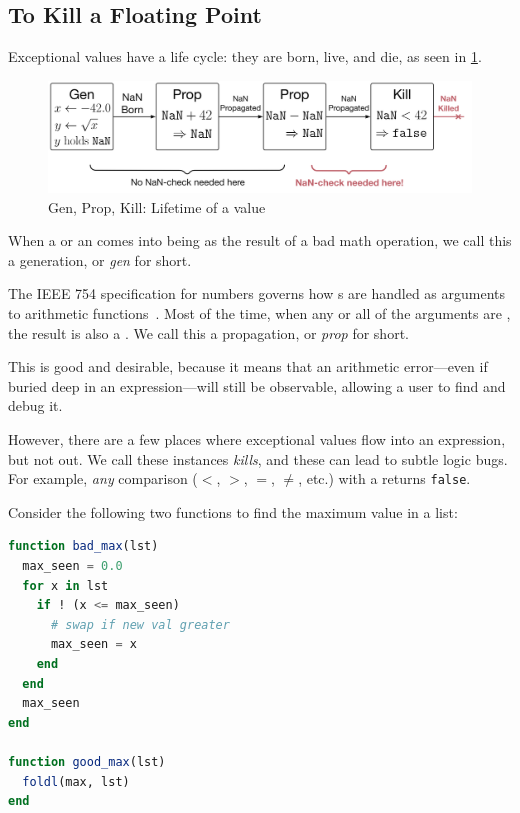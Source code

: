 \documentclass{juliacon}
\begin{document}
\subsection{To Kill a Floating Point}
\label{s:to-kill-a-fp}

Exceptional values have a life cycle: they are born, live, and die, as seen in \cref{f:gpk}.

\begin{figure}
  \includegraphics[width=\columnwidth]{fig/genpropkill-outline.png}
  \caption{Gen, Prop, Kill: Lifetime of a \NaN{} value}
  \label{f:gpk}
\end{figure}

When a \NaN{} or an \Inf{} comes into being as the result of a bad math operation, we call this a generation, or \emph{gen} for short.

The IEEE 754 specification for \fp{} numbers governs how \NaN{}s are handled as arguments to arithmetic functions~\cite{IEEEStandardBinary1985}.
Most of the time, when any or all of the arguments are \NaN{}, the result is also a \NaN{}.
We call this a propagation, or \emph{prop} for short.

This is good and desirable, because it means that an arithmetic error---even if buried deep in an expression---will still be observable, allowing a user to find and debug it.

However, there are a few places where exceptional values flow into an expression, but not out.
We call these instances \emph{kills}, and these can lead to subtle logic bugs.
For example, \emph{any} comparison ($<$, $>$, $=$, $\neq$, etc.) with a \NaN{} returns \texttt{false}.

Consider the following two functions to find the maximum value in a list:

\begin{lstlisting}[language = Julia]
function bad_max(lst)
  max_seen = 0.0
  for x in lst
    if ! (x <= max_seen)
      # swap if new val greater
      max_seen = x
    end
  end
  max_seen
end

function good_max(lst)
  foldl(max, lst)
end
\end{lstlisting}
\end{document}
